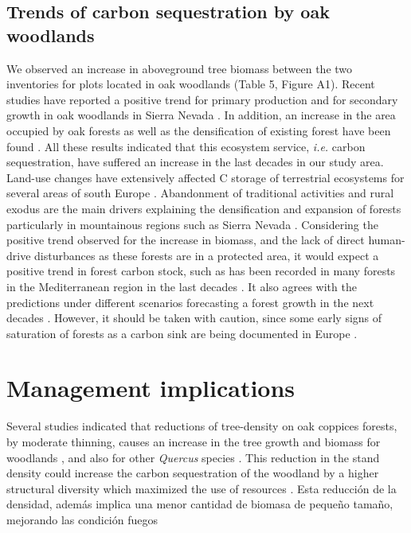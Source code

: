 \subsection{Trends of carbon sequestration by oak woodlands}\label{sec:carbon:discussion-trends}
We observed an increase in aboveground tree biomass between the two inventories for plots located in oak woodlands (Table 5, Figure A1). Recent studies have reported a positive trend for primary production and for secondary growth in oak woodlands in Sierra Nevada \autocite{AlcarazSeguraetal2016ChangesVegetation,Dionisioetal2012SatelliteBasedMonitoring,PerezLuqueetal2015OntologicalSystem,PerezLuqueetal2020LanduseLegacies}. In addition, an increase in the area occupied by oak forests \autocite{CamachoOlmedoetal2002TransformacionPaisaje} as well as the densification of existing forest have been found \autocite{JimenezOlivenciaetal2015MedioSiglo}. All these results indicated that this ecosystem service, \emph{i.e.} carbon sequestration, have suffered an increase in the last decades in our study area. Land-use changes have extensively affected C storage of terrestrial ecosystems for several areas of south Europe \autocite{MunozRojasetal2011ChangesLand,MunozRojasetal2015ImpactLand}. Abandonment of traditional activities and rural exodus are the main drivers explaining the densification and expansion of forests particularly in mountainous regions such as Sierra Nevada \autocite{JimenezOlivenciaetal2015MedioSiglo,MacDonaldetal2000AgriculturalAbandonment}. Considering the positive trend observed for the increase in biomass, and the lack of direct human-drive disturbances as these forests are in a protected area, it would expect a positive trend in forest carbon stock, such as has been recorded in many forests in the Mediterranean region in the last decades \autocite{FAOPlanBleu2018StateMediterranean}. It also agrees with the predictions under different scenarios forecasting a forest growth in the next decades \autocite{Aparicioetal2015ClimateChange}. However, it should be taken with caution, since some early signs of saturation of forests as a carbon sink are being documented in Europe \autocite{Nabuursetal2013FirstSigns}.

\section{Management implications}\label{sec:carbon:discussion-management}

Several studies indicated that reductions of tree-density on oak coppices forests, by moderate thinning, causes an increase in the tree growth and biomass for \Qp woodlands \autocite{Aldeaetal2017ThinningEnhances,Aldeaetal2017EfectoClaras,MorenoFernandezetal2020InfluenceClimate,Canellasetal2004GrowthResponse}, and also for other \emph{Quercus} species \autocites[\emph{e.g.}][]{Cotillasetal2009GrowthResponse,FernandezdeUnaetal2015StandCompetition}. This reduction in the stand density could increase the carbon sequestration of the woodland by a higher structural diversity which maximized the use of resources \autocite{CastanoSantamariaetal2013PotentialGround}. Esta reducción de la densidad, además implica una menor cantidad de biomasa de pequeño tamaño, mejorando las condición fuegos